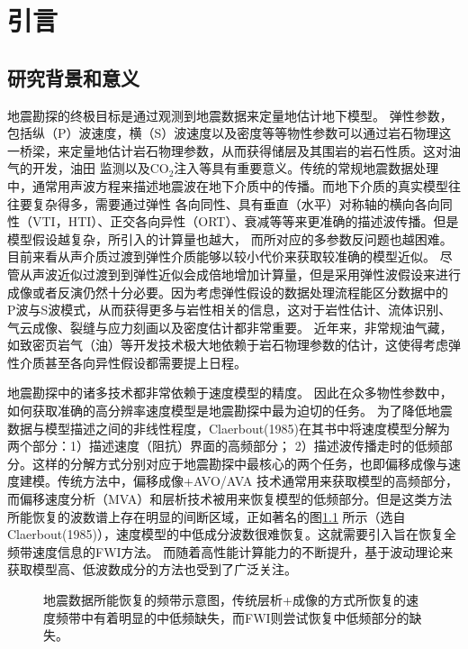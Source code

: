 \chapter{引言}
\section{研究背景和意义}
地震勘探的终极目标是通过观测到地震数据来定量地估计地下模型。
弹性参数，包括纵（P）波速度，横（S）波速度以及密度等等物性参数可以通过岩石物理这一桥梁，来定量地估计岩石物理参数，从而获得储层及其围岩的岩石性质。这对油气的开发，油田
监测以及CO$_2$注入等具有重要意义。传统的常规地震数据处理中，通常用声波方程来描述地震波在地下介质中的传播。而地下介质的真实模型往往要复杂得多，需要通过弹性
各向同性、具有垂直（水平）对称轴的横向各向同性（VTI，HTI）、正交各向异性（ORT）、衰减等等来更准确的描述波传播。但是模型假设越复杂，所引入的计算量也越大，
而所对应的多参数反问题也越困难。目前来看从声介质过渡到弹性介质能够以较小代价来获取较准确的模型近似。
尽管从声波近似过渡到到弹性近似会成倍地增加计算量，但是采用弹性波假设来进行成像或者反演仍然十分必要。因为考虑弹性假设的数据处理流程能区分数据中的
P波与S波模式，从而获得更多与岩性相关的信息，这对于岩性估计、流体识别、气云成像、裂缝与应力刻画以及密度估计都非常重要。
近年来，非常规油气藏，如致密页岩气（油）等开发技术极大地依赖于岩石物理参数的估计，这使得考虑弹性介质甚至各向异性假设都需要提上日程。

地震勘探中的诸多技术都非常依赖于速度模型的精度。
因此在众多物性参数中，如何获取准确的高分辨率速度模型是地震勘探中最为迫切的任务。
为了降低地震数据与模型描述之间的非线性程度，Claerbout(1985)\cite{Claerbout1985Imaging}在其书中将速度模型分解为两个部分：1）描述速度（阻抗）界面的高频部分；
2）描述波传播走时的低频部分。这样的分解方式分别对应于地震勘探中最核心的两个任务，也即偏移成像与速度建模。传统方法中，偏移成像+AVO/AVA
技术通常用来获取模型的高频部分，
而偏移速度分析（MVA）和层析技术被用来恢复模型的低频部分。但是这类方法所能恢复的波数谱上存在明显的间断区域，正如著名的图\ref{fig:GapInSeisVel}
所示（选自Claerbout(1985)\cite{Claerbout1985Imaging}），速度模型的中低成分波数很难恢复。这就需要引入旨在恢复全频带速度信息的FWI方法。
而随着高性能计算能力的不断提升，基于波动理论来获取模型高、低波数成分的方法也受到了广泛关注。
\begin{figure}[!htb] 
   \centering 
   \caption{地震数据所能恢复的频带示意图，传统层析+成像的方式所恢复的速度频带中有着明显的中低频缺失，而FWI则尝试恢复中低频部分的缺失。}
   \label{fig:GapInSeisVel}
\end{figure}

